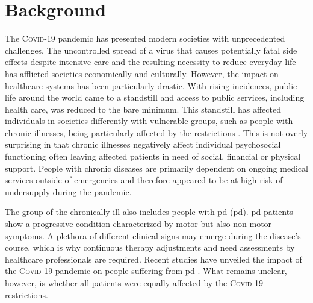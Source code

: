 \documentclass{bmcart}
\begin{document}
\begin{frontmatter}
\begin{abstractbox}
\begin{abstract}
\end{abstract}


\begin{keyword}%
\end{keyword}

\end{abstractbox}

\end{frontmatter}


\section*{Background}
The \textsc{Covid}-19 pandemic has presented modern societies with unprecedented challenges. The uncontrolled spread of a virus that causes potentially fatal side effects despite intensive care and the resulting necessity to reduce everyday life has afflicted societies economically and culturally. However, the impact on healthcare systems has been particularly drastic. With rising incidences, public life around the world came to a standstill and access to public services, including health care, was reduced to the bare minimum. This standstill has affected individuals in societies differently with vulnerable groups, such as people with chronic illnesses, being particularly affected by the restrictions \cite{sepulveda2020impact, kasar2021lif, yogev2021covid}. This is not overly surprising in that chronic illnesses negatively affect individual psychosocial functioning \cite{demirtepe2022psychosocial} often leaving affected patients in need of social, financial or physical support. People with chronic diseases are primarily dependent on ongoing medical services outside of emergencies and therefore appeared to be at high risk of undersupply during the pandemic. 

The group of the chronically ill also includes people with \acl{pd} (\acs{pd}). \ac{pd}-patients show a progressive condition characterized by motor but also non-motor symptoms. A plethora of different clinical signs may emerge during the disease's course, which is why continuous therapy adjustments and need assessments by healthcare professionals are required. Recent studies have unveiled the impact of the \textsc{Covid}-19 pandemic on people suffering from \ac{pd} \cite{yogev2021covid, zipprich2020knowledge, frundt2022impact, richter2021analysis, brooks2021social}. What remains unclear, however, is whether all patients were equally affected by the \textsc{Covid}-19 restrictions.
\end{document}

